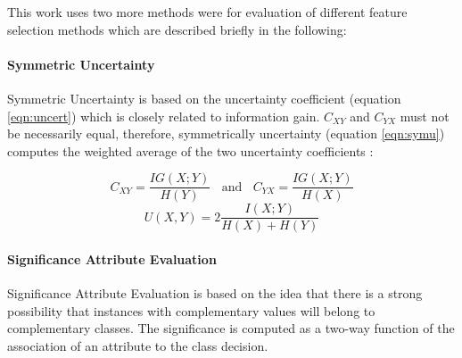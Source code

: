 			This work uses two more methods were for evaluation of different feature selection methods which are described briefly in the following:			
			
			\paragraph{Symmetric  Uncertainty}			
			\label{para:symuncert}
				Symmetric Uncertainty is based on the uncertainty coefficient (equation \ref{eqn:uncert}) \cite{Press88} which is closely related to information gain. $C_{XY}$ and $C_{YX}$ must not be necessarily equal, therefore, symmetrically uncertainty (equation \ref{eqn:symu}) \cite{Witten2005} computes the weighted average of the two uncertainty coefficients :

				\begin{equation}
				\label{eqn:uncert}
					C_{XY}=\frac{IG(X;Y)}{H(Y)} ~~~~\mbox{and}~~~~ C_{YX}=\frac{IG(X;Y)}{H(X)}
				\end{equation}
				\begin{equation}
				\label{eqn:symu}
					U(X,Y) = 2 \frac{I(X;Y)}{H(X)+H(Y)}
				\end{equation}

			\paragraph{Significance Attribute Evaluation}
			\label{para:sigattreval}
				Significance Attribute Evaluation \cite{Ahmad2004} is based on the idea that there is a strong possibility that instances with complementary values will belong to complementary classes. The significance is computed as a two-way function of the association of an attribute to the class decision.